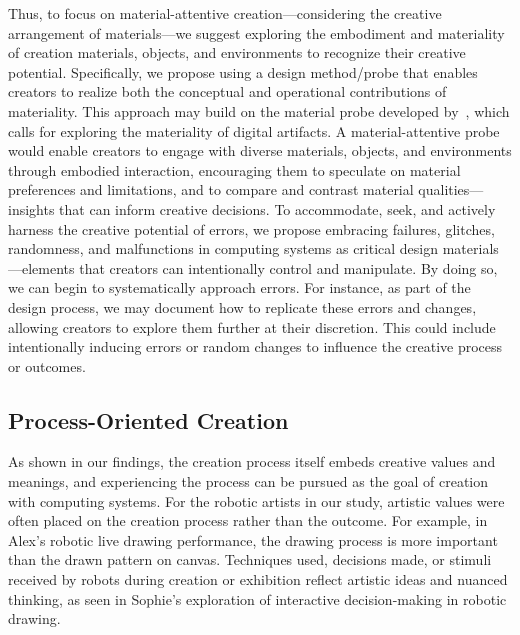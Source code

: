 Thus, to focus on material-attentive creation---considering the creative arrangement of materials---we suggest exploring the embodiment and materiality of creation materials, objects, and environments to recognize their creative potential. %
Specifically, we propose using a design method/probe that enables creators to realize both the conceptual and operational contributions of materiality. This approach may build on the material probe developed by~\citet{jung2010material}, which calls for exploring the materiality of digital artifacts. A material-attentive probe would enable creators to engage with diverse materials, objects, and environments through embodied interaction, encouraging them to speculate on material preferences and limitations, and to compare and contrast material qualities---insights that can inform creative decisions.
To accommodate, seek, and actively harness the creative potential of errors, we propose embracing failures, glitches, randomness, and malfunctions in computing systems as critical design materials---elements that creators can intentionally control and manipulate. By doing so, we can begin to systematically approach errors. For instance, as part of the design process, we may document how to replicate these errors and changes, allowing creators to explore them further at their discretion. This could include intentionally inducing errors or random changes to influence the creative process or outcomes.

\subsection{Process-Oriented Creation}

As shown in our findings, the creation process itself embeds creative values and meanings, and experiencing the process can be pursued as the goal of creation with computing systems.
For the robotic artists in our study, artistic values were often placed on the creation process rather than the outcome.  For example, in Alex's robotic live drawing performance, the drawing process is more important than the drawn pattern on canvas. Techniques used, decisions made, or stimuli received by robots during creation or exhibition reflect artistic ideas and nuanced thinking, as seen in Sophie's exploration of interactive decision-making in robotic drawing.

